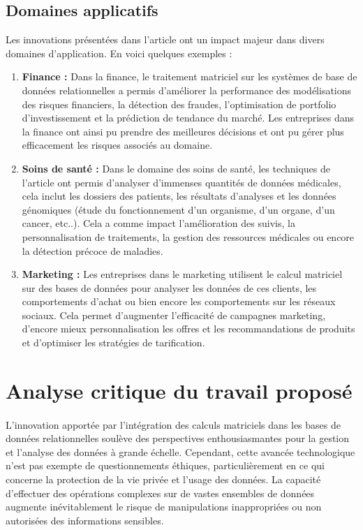 \documentclass[a4paper, 12pt]{article}
\begin{document}
\subsection{Domaines applicatifs}

Les innovations présentées dans l'article ont un impact majeur dans divers domaines d'application. En voici quelques exemples : 


\begin{enumerate}[label={-}]
	\item \textbf{Finance :} Dans la finance, le traitement matriciel sur les systèmes de base de données relationnelles a permis d'améliorer la performance des modélisations des risques financiers, la détection des fraudes, l'optimisation de portfolio d'investissement et la prédiction de tendance du marché. Les entreprises dans la finance ont ainsi pu prendre des meilleures décisions et ont pu gérer plus efficacement les risques associés au domaine.
	\item \textbf{Soins de santé :} Dans le domaine des soins de santé, les techniques de l'article ont permis d'analyser d'immenses quantités de données médicales, cela inclut les dossiers des patients, les résultats d'analyses et les données génomiques (étude du fonctionnement d'un organisme, d'un organe, d'un cancer, etc..). Cela a comme impact l'amélioration des suivis, la personnalisation de traitements, la gestion des ressources médicales ou encore la détection précoce de maladies.
	\item \textbf{Marketing :} Les entreprises dans le marketing utilisent le calcul matriciel sur des bases de données pour analyser les données de ces clients, les comportements d'achat ou bien encore les comportements sur les réseaux sociaux. Cela permet d'augmenter l'efficacité de campagnes marketing, d'encore mieux personnalisation les offres et les recommandations de produits et d'optimiser les stratégies de tarification.
\end{enumerate}


\clearpage 
\section{Analyse critique du travail proposé}

\paragraph{}
L'innovation apportée par l'intégration des calculs matriciels dans les bases de données relationnelles soulève des perspectives enthousiasmantes pour la gestion et l'analyse des données à grande échelle. Cependant, cette avancée technologique n'est pas exempte de questionnements éthiques, particulièrement en ce qui concerne la protection de la vie privée et l'usage des données. La capacité d'effectuer des opérations complexes sur de vastes ensembles de données augmente inévitablement le risque de manipulations inappropriées ou non autorisées des informations sensibles.
\end{document}
